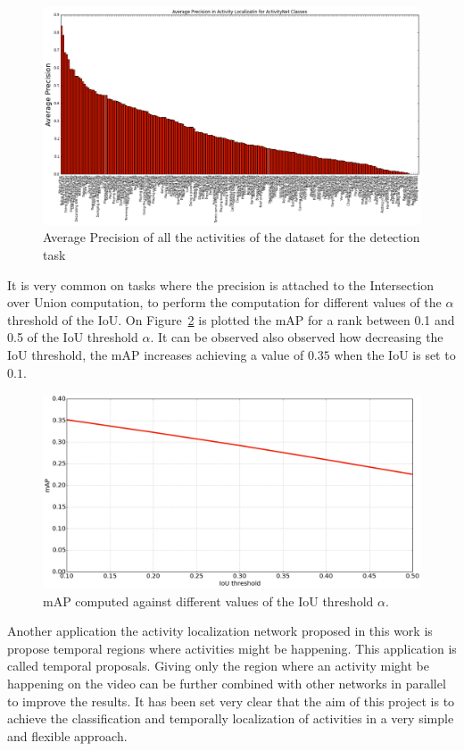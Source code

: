 \begin{figure}[ht]
\begin{center}
\includegraphics[width=0.8\linewidth]{img/results/ap_by_activity_detection}
\end{center}
\caption{Average Precision of all the activities of the dataset for the detection task}
\label{fig:ap_by_activity_classification}
\end{figure}

It is very common on tasks where the precision is attached to the Intersection over Union computation, to perform the computation for different values of the $\alpha$ threshold of the IoU. On Figure~\ref{fig:map_vs_iou} is plotted the mAP for a rank between 0.1 and 0.5 of the IoU threshold $\alpha$. It can be observed also observed how decreasing the IoU threshold, the mAP increases achieving a value of $0.35$ when the IoU is set to $0.1$.

\begin{figure}[H]
\begin{center}
\includegraphics[width=0.8\linewidth]{img/results/map_vs_iou}
\end{center}
\caption{mAP computed against different values of the IoU threshold $\alpha$.}
\label{fig:map_vs_iou}
\end{figure}

Another application the activity localization network proposed in this work is propose temporal regions where activities might be happening. This application is called temporal proposals. Giving only the region where an activity might be happening on the video can be further combined with other networks in parallel to improve the results. It has been set very clear that the aim of this project is to achieve the classification and temporally localization of activities in a very simple and flexible approach.

